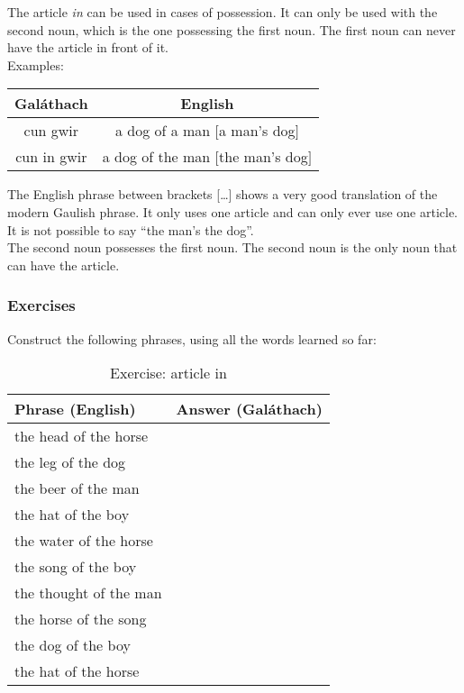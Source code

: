 The article \textit{in} can be used in cases of possession. It can only be used with the second noun, which is the one possessing the first noun. The first noun can never have the article in front of it.\\
Examples:
\begin{table}[H]
\centering
\begin{tabu}{c|c}
  \textbf{Gal\'{a}thach} & \textbf{English}\\
  \toprule
  cun gwir & a dog of a man $[$a man's dog$]$\\
  cun in gwir & a dog of the man $[$the man's dog$]$
\end{tabu}
\label{examples_possession_first_noun_no_particle_in_front}
\end{table}

The English phrase between brackets [\dots] shows a very good translation of the modern Gaulish phrase. It only uses one article and can only ever use one article. It is not possible to say ``the man's the dog''.\\

The second noun possesses the first noun. The second noun is the only noun that can have the article.

\subsubsection{Exercises}

Construct the following phrases, using all the words learned so far:
\begin{table}[H]
\centering
\begin{tabu}{|l|p{10.0cm}|}
  \toprule
  \textbf{Phrase (English)} & \textbf{Answer (Gal\'{a}thach)}\\
  \toprule
  the head of the horse & \\
  \midrule
  the leg of the dog & \\
  \midrule
  the beer of the man & \\
  \midrule
  the hat of the boy & \\
  \midrule
  the water of the horse & \\
  \midrule
  the song of the boy & \\
  \midrule
  the thought of the man & \\
  \midrule
  the horse of the song & \\
  \midrule
  the dog of the boy & \\
  \midrule
  the hat of the horse & \\
  \bottomrule
\end{tabu}
\label{exercises_article_in}
\caption{Exercise: article in}
\end{table}

